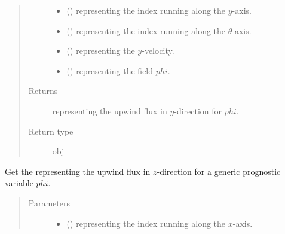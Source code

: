 \documentclass[letterpaper,10pt,english]{sphinxmanual}
\begin{document}
\begin{fulllineitems}
\begin{fulllineitems}
\begin{quote}
\begin{description}
\begin{itemize}
\item {} 
 () \textendash{}  representing the index running along the \(y\)-axis.

\item {} 
 () \textendash{}  representing the index running along the \(\theta\)-axis.

\item {} 
 () \textendash{}  representing the \(y\)-velocity.

\item {} 
 () \textendash{}  representing the field \(phi\).

\end{itemize}

\item[{Returns}] \leavevmode
{} representing the upwind flux in \(y\)-direction for \(phi\).

\item[{Return type}] \leavevmode
obj

\end{description}\end{quote}

\end{fulllineitems}


\begin{fulllineitems}
\label{\detokenize{api:dycore.flux_isentropic_upwind.FluxIsentropicUpwind._get_upwind_flux_z}}
Get the  representing the upwind flux in \(z\)-direction
for a generic prognostic variable \(phi\).
\begin{quote}\begin{description}
\item[{Parameters}] \leavevmode\begin{itemize}
\item {} 
 () \textendash{}  representing the index running along the \(x\)-axis.


\end{itemize}
\end{description}
\end{quote}
\end{fulllineitems}
\end{fulllineitems}
\end{document}
